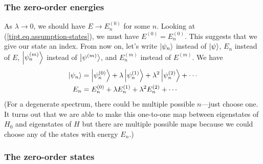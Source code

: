 \documentclass[11pt]{article}
\theoremstyle{theorem}
\theoremstyle{remark}
\theoremstyle{step}
\theoremstyle{gap}
\begin{document}
\subsubsection{The zero-order energies}

As \(\lambda \to 0\), we should have \(E \to E_n^{(0)}\) for some \(n\). Looking at (\ref{tipt.eq.assumption-states}), we must have \(\boxed{E^{(0)} = E_n^{(0)}.}\) This suggests that we give our state an index. From now on, let's write \(\ksn{n}\) instead of \(\ks\), \(E_n\) instead of \(E\), \(\ksnp{n}{m}\) instead of \(\ksp{m}\), and \(E_n^{(m)}\) instead of \(E^{(m)}\). We have
\begin{align}
\ksn{n} &= \ksnp{n}{0} + \lambda \ksnp{n}{1} + \lambda^2 \ksnp{n}{2} + \cdots \label{tipt.eq.assumption-states2}\\
E_n &= E_n^{(0)} + \lambda E_n^{(1)} + \lambda^2 E_n^{(2)} + \cdots \label{tipt.eq.assumption-states2}
\end{align}
(For a degenerate spectrum, there could be multiple possible \(n\)---just choose one. It turns out that we are able to make this one-to-one map between eigenstates of \(H_0\) and eigenstates of \(H\) but there are multiple possible maps because we could choose any of the states with energy \(E_n\).)

\subsubsection{The zero-order states}
\end{document}
